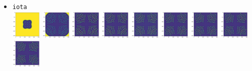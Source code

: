 \begin{itemize}
\item {\tt iota}\\
\includegraphics[height=1.4cm]{python_codes/fieldstone_171/pearson93_rand/iota_solution_0001000_u}
\includegraphics[height=1.4cm]{python_codes/fieldstone_171/pearson93_rand/iota_solution_0005000_u}
\includegraphics[height=1.4cm]{python_codes/fieldstone_171/pearson93_rand/iota_solution_0010000_u}
\includegraphics[height=1.4cm]{python_codes/fieldstone_171/pearson93_rand/iota_solution_0015000_u}
\includegraphics[height=1.4cm]{python_codes/fieldstone_171/pearson93_rand/iota_solution_0020000_u}
\includegraphics[height=1.4cm]{python_codes/fieldstone_171/pearson93_rand/iota_solution_0030000_u}
\includegraphics[height=1.4cm]{python_codes/fieldstone_171/pearson93_rand/iota_solution_0040000_u}
\includegraphics[height=1.4cm]{python_codes/fieldstone_171/pearson93_rand/iota_solution_0050000_u}
\includegraphics[height=1.4cm]{python_codes/fieldstone_171/pearson93_rand/iota_solution_final_u}\\

\end{itemize}

